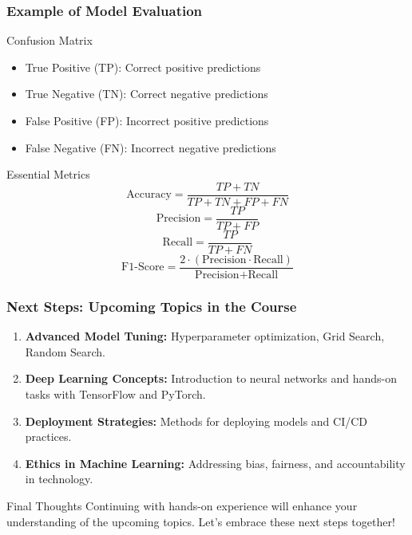 \documentclass[aspectratio=169]{beamer}
\begin{document}
\begin{frame}[fragile]
    \frametitle{Example of Model Evaluation}
    \begin{block}{Confusion Matrix}
        \begin{itemize}
            \item True Positive (TP): Correct positive predictions
            \item True Negative (TN): Correct negative predictions
            \item False Positive (FP): Incorrect positive predictions
            \item False Negative (FN): Incorrect negative predictions
        \end{itemize}
    \end{block}

    \begin{block}{Essential Metrics}
        \begin{equation}
            \text{Accuracy} = \frac{TP + TN}{TP + TN + FP + FN}
        \end{equation}
        \begin{equation}
            \text{Precision} = \frac{TP}{TP + FP}
        \end{equation}
        \begin{equation}
            \text{Recall} = \frac{TP}{TP + FN}
        \end{equation}
        \begin{equation}
            \text{F1-Score} = \frac{2 \cdot (\text{Precision} \cdot \text{Recall})}{\text{Precision} + \text{Recall}}
        \end{equation}
    \end{block}
\end{frame}

\begin{frame}[fragile]
    \frametitle{Next Steps: Upcoming Topics in the Course}
    \begin{enumerate}
        \item \textbf{Advanced Model Tuning:} Hyperparameter optimization, Grid Search, Random Search.
        \item \textbf{Deep Learning Concepts:} Introduction to neural networks and hands-on tasks with TensorFlow and PyTorch.
        \item \textbf{Deployment Strategies:} Methods for deploying models and CI/CD practices.
        \item \textbf{Ethics in Machine Learning:} Addressing bias, fairness, and accountability in technology.
    \end{enumerate}

    \begin{block}{Final Thoughts}
        Continuing with hands-on experience will enhance your understanding of the upcoming topics. Let's embrace these next steps together!
    \end{block}
\end{frame}
\end{document}
